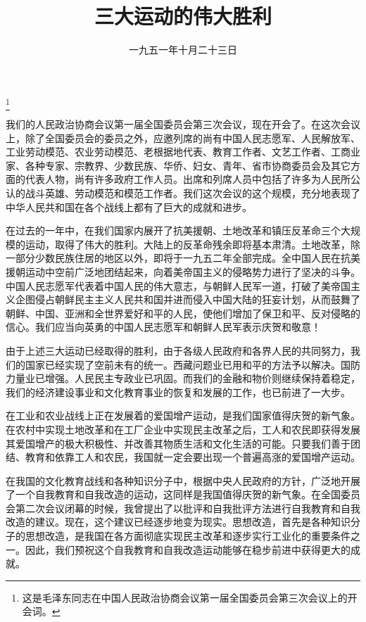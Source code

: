 
\title{三大运动的伟大胜利}
\date{一九五一年十月二十三日}
\thanks{这是毛泽东同志在中国人民政治协商会议第一届全国委员会第三次会议上的开会词。}
\maketitle



我们的人民政治协商会议第一届全国委员会第三次会议，现在开会了。在这次会议上，除了全国委员会的委员之外，应邀列席的尚有中国人民志愿军、人民解放军、工业劳动模范、农业劳动模范、老根据地代表、教育工作者、文艺工作者、工商业家、各种专家、宗教界、少数民族、华侨、妇女、青年、省市协商委员会及其它方面的代表人物，尚有许多政府工作人员。出席和列席人员中包括了许多为人民所公认的战斗英雄、劳动模范和模范工作者。我们这次会议的这个规模，充分地表现了中华人民共和国在各个战线上都有了巨大的成就和进步。

在过去的一年中，在我们国家内展开了抗美援朝、土地改革和镇压反革命三个大规模的运动，取得了伟大的胜利。大陆上的反革命残余即将基本肃清。土地改革，除一部分少数民族住居的地区以外，即将于一九五二年全部完成。全中国人民在抗美援朝运动中空前广泛地团结起来，向着美帝国主义的侵略势力进行了坚决的斗争。中国人民志愿军代表着中国人民的伟大意志，与朝鲜人民军一道，打破了美帝国主义企图侵占朝鲜民主主义人民共和国并进而侵入中国大陆的狂妄计划，从而鼓舞了朝鲜、中国、亚洲和全世界爱好和平的人民，使他们增加了保卫和平、反对侵略的信心。我们应当向英勇的中国人民志愿军和朝鲜人民军表示庆贺和敬意！

由于上述三大运动已经取得的胜利，由于各级人民政府和各界人民的共同努力，我们的国家已经实现了空前未有的统一。西藏问题业已用和平的方法予以解决。国防力量业已增强。人民民主专政业已巩固。而我们的金融和物价则继续保持着稳定，我们的经济建设事业和文化教育事业的恢复和发展的工作，也已前进了一大步。

在工业和农业战线上正在发展着的爱国增产运动，是我们国家值得庆贺的新气象。在农村中实现土地改革和在工厂企业中实现民主改革之后，工人和农民即获得发展其爱国增产的极大积极性、并改善其物质生活和文化生活的可能。只要我们善于团结、教育和依靠工人和农民，我国就一定会要出现一个普遍高涨的爱国增产运动。

在我国的文化教育战线和各种知识分子中，根据中央人民政府的方针，广泛地开展了一个自我教育和自我改造的运动，这同样是我国值得庆贺的新气象。在全国委员会第二次会议闭幕的时候，我曾提出了以批评和自我批评方法进行自我教育和自我改造的建议。现在，这个建议已经逐步地变为现实。思想改造，首先是各种知识分子的思想改造，是我国在各方面彻底实现民主改革和逐步实行工业化的重要条件之一。因此，我们预祝这个自我教育和自我改造运动能够在稳步前进中获得更大的成就。

